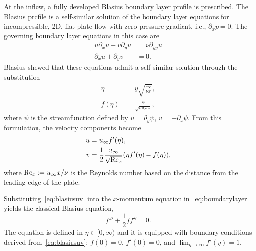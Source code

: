 \documentclass[../main.tex]{subfiles}
\begin{document}
At the inflow, a fully developed Blasius boundary layer profile is prescribed. The Blasius profile is a self-similar solution of the boundary layer equations for incompressible, 2D, flat-plate flow with zero pressure gradient, i.e., $\partial_x p = 0$. The governing boundary layer equations in this case are
\begin{equation}
	\begin{aligned}
		u \partial_x u + v \partial_y u & = \nu \partial_{yy} u \\
		\partial_x u + \partial_y v                    & = 0.
	\end{aligned}
	\label{eq:boundarylayer}
\end{equation}
Blasius showed that these equations admit a self-similar solution through the substitution~\cite{blasius1908grenzschichten}
\begin{equation}
	\begin{aligned}
		\eta    & = y \sqrt{\frac{u_\infty}{\nu x}},    \\
		f(\eta) & = \frac{\psi}{\sqrt{\nu u_\infty x}},
	\end{aligned}
	\label{eq:blasius}
\end{equation}
where $\psi$ is the streamfunction defined by $u = \partial_y \psi$, $v = -\partial_x \psi$. From this formulation, the velocity components become
\begin{equation}
	\begin{aligned}
		u & = u_\infty f'(\eta),                                                    \\
		v & = \frac{1}{2} \frac{u_\infty}{\sqrt{\text{Re}_x}} (\eta f'(\eta) - f(\eta)),
	\end{aligned}
	\label{eq:blasiusuv}
\end{equation}
where $\text{Re}_x := u_\infty x / \nu$ is the Reynolds number based on the distance from the leading edge of the plate.

Substituting~\eqref{eq:blasiusuv} into the $x$-momentum equation in~\eqref{eq:boundarylayer} yields the classical Blasius equation,
\begin{equation}
	f''' + \frac{1}{2} f f'' = 0.
	\label{eq:blasiusODE}
\end{equation}
The equation is defined in $\eta \in[0,\infty)$ and it is equipped with boundary conditions derived from~\eqref{eq:blasiusuv}: $f(0) = 0$, $f'(0) = 0$, and $\lim_{\eta\to\infty} f'(\eta) = 1$.
\end{document}
